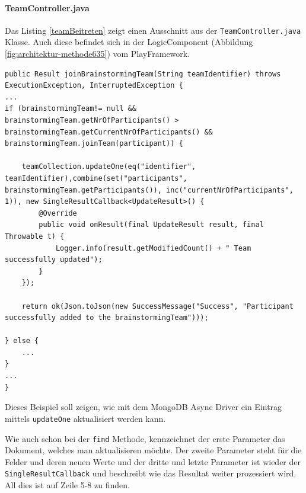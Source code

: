 \paragraph*{TeamController.java}
Das Listing \ref{teamBeitreten} zeigt einen Ausschnitt aus der \texttt{TeamController.java} Klasse. Auch diese befindet sich in der LogicComponent (Abbildung \ref{fig:architektur-methode635}) vom PlayFramework.
\begin{lstlisting}[caption={Einem Team beitreten}, label=teamBeitreten]
public Result joinBrainstormingTeam(String teamIdentifier) throws ExecutionException, InterruptedException {
...
if (brainstormingTeam!= null && brainstormingTeam.getNrOfParticipants() > brainstormingTeam.getCurrentNrOfParticipants() && brainstormingTeam.joinTeam(participant)) {

    teamCollection.updateOne(eq("identifier", teamIdentifier),combine(set("participants", brainstormingTeam.getParticipants()), inc("currentNrOfParticipants", 1)), new SingleResultCallback<UpdateResult>() {
        @Override
        public void onResult(final UpdateResult result, final Throwable t) {
            Logger.info(result.getModifiedCount() + " Team successfully updated");
        }
    });

    return ok(Json.toJson(new SuccessMessage("Success", "Participant successfully added to the brainstormingTeam")));

} else {
    ...
}
...
}
\end{lstlisting}

Dieses Beispiel soll zeigen, wie mit dem MongoDB Async Driver ein Eintrag mittels \texttt{updateOne} aktualisiert werden kann.

Wie auch schon bei der \texttt{find} Methode, kennzeichnet der erste Parameter das Dokument, welches man aktualisieren möchte. Der zweite Parameter steht für die Felder und deren neuen Werte und der dritte und letzte Parameter ist wieder der \texttt{SingleResultCallback} und beschreibt wie das Resultat weiter prozessiert wird. All dies ist auf Zeile 5-8 zu finden.


